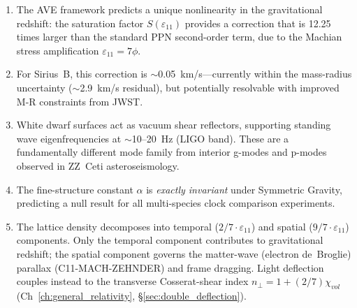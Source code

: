 \begin{enumerate}
    \item The AVE framework predicts a unique nonlinearity in the gravitational
    redshift: the saturation factor $S(\varepsilon_{11})$ provides a correction
    that is 12.25 times larger than the standard PPN second-order term,
    due to the Machian stress amplification $\varepsilon_{11} = 7\phi$.

    \item For Sirius~B, this correction is $\sim$0.05~km/s---currently
    within the mass-radius uncertainty ($\sim$2.9~km/s residual),
    but potentially resolvable with improved M-R constraints from JWST.

    \item White dwarf surfaces act as vacuum shear reflectors,
    supporting standing wave eigenfrequencies at $\sim$10--20~Hz (LIGO band).
    These are a fundamentally different mode family from interior
    g-modes and p-modes observed in ZZ~Ceti asteroseismology.

    \item The fine-structure constant $\alpha$ is \textit{exactly invariant}
    under Symmetric Gravity, predicting a null result for all
    multi-species clock comparison experiments.

    \item The lattice density decomposes into temporal ($2/7 \cdot \varepsilon_{11}$)
    and spatial ($9/7 \cdot \varepsilon_{11}$) components.
    Only the temporal component contributes to gravitational redshift;
    the spatial component governs the matter-wave (electron de~Broglie) parallax
    (C11-MACH-ZEHNDER) and frame dragging. Light deflection couples instead to the
    transverse Cosserat-shear index $n_\perp = 1 + (2/7)\chi_{vol}$
    (Ch~\ref{ch:general_relativity}, \S\ref{sec:double_deflection}).
\end{enumerate}

